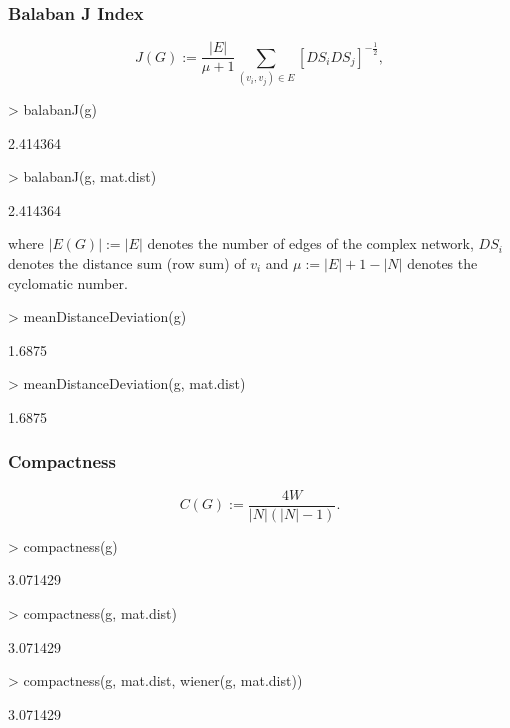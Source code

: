 \documentclass[a4paper]{article}
\begin{document}
\subsubsection*{Balaban J Index}
\begin{equation}
J(G):= \frac{|E|}{\mu + 1} \sum_{(v_i,v_j) \in E} [DS{_i}DS{_j}]^{- \frac{1}{2}},
\end{equation}
\begin{Schunk}
\begin{Sinput}
> balabanJ(g)
\end{Sinput}
\begin{Soutput}
[1] 2.414364
\end{Soutput}
\begin{Sinput}
> balabanJ(g, mat.dist)
\end{Sinput}
\begin{Soutput}
[1] 2.414364
\end{Soutput}
\end{Schunk}
where $|E(G)|:= |E|$ denotes the number of edges of the complex network, $DS_i$ denotes the distance sum (row sum) of $v_i$ and $\mu := |E| + 1 - |N|$ denotes the cyclomatic number.
\begin{Schunk}
\begin{Sinput}
> meanDistanceDeviation(g)
\end{Sinput}
\begin{Soutput}
[1] 1.6875
\end{Soutput}
\begin{Sinput}
> meanDistanceDeviation(g, mat.dist)
\end{Sinput}
\begin{Soutput}
[1] 1.6875
\end{Soutput}
\end{Schunk}

\subsubsection*{Compactness}
\begin{equation}
C(G):= \frac{4W}{|N|(|N|-1)}.
\end{equation}
\begin{Schunk}
\begin{Sinput}
> compactness(g)
\end{Sinput}
\begin{Soutput}
[1] 3.071429
\end{Soutput}
\begin{Sinput}
> compactness(g, mat.dist)
\end{Sinput}
\begin{Soutput}
[1] 3.071429
\end{Soutput}
\begin{Sinput}
> compactness(g, mat.dist, wiener(g, mat.dist))
\end{Sinput}
\begin{Soutput}
[1] 3.071429
\end{Soutput}
\end{Schunk}
\end{document}
